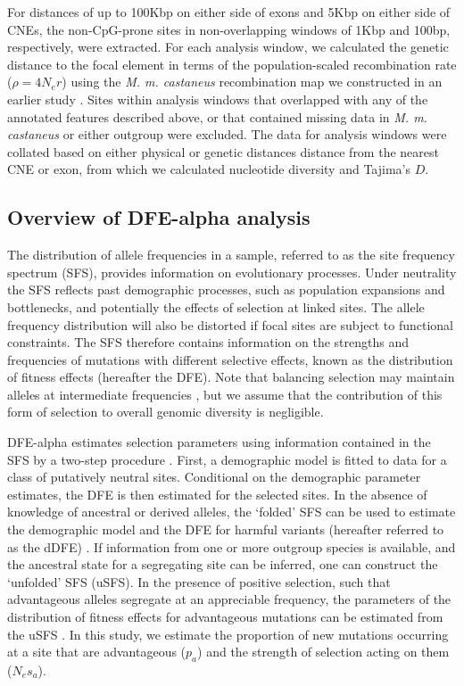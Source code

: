 	For distances of up to 100Kbp on either side of exons and 5Kbp on either side of CNEs, the non-CpG-prone sites in non-overlapping windows of 1Kbp and 100bp, respectively, were extracted. For each analysis window, we calculated the genetic distance to the focal element in terms of the population-scaled recombination rate ($\rho = 4N_er$) using the \textit{M. m. castaneus} recombination map we constructed in an earlier study \citep{RN340}. Sites within analysis windows that overlapped with any of the annotated features described above, or that contained missing data in \textit{M. m. castaneus} or either outgroup were excluded. The data for analysis windows were collated based on either physical or genetic distances distance from the nearest CNE or exon, from which we calculated nucleotide diversity and Tajima's $D$.

\subsection{Overview of DFE-alpha analysis}

	The distribution of allele frequencies in a sample, referred to as the site frequency spectrum (SFS), provides information on evolutionary processes. Under neutrality the SFS reflects past demographic processes, such as population expansions and bottlenecks, and potentially the effects of selection at linked sites. The allele frequency distribution will also be distorted if focal sites are subject to functional constraints. The SFS therefore contains information on the strengths and frequencies of mutations with different selective effects, known as the distribution of fitness effects (hereafter the DFE). Note that balancing selection may maintain alleles at intermediate frequencies \citep{RN103}, but we assume that the contribution of this form of selection to overall genomic diversity is negligible.

	DFE-alpha estimates selection parameters using information contained in the SFS by a two-step procedure \citep{RN164}. First, a demographic model is fitted to data for a class of putatively neutral sites. Conditional on the demographic parameter estimates, the DFE is then estimated for the selected sites. In the absence of knowledge of ancestral or derived alleles, the ‘folded’ SFS can be used to estimate the demographic model and the DFE for harmful variants (hereafter referred to as the dDFE) \citep{RN164}. If information from one or more outgroup species is available, and the ancestral state for a segregating site can be inferred, one can construct the ‘unfolded’ SFS (uSFS). In the presence of positive selection, such that advantageous alleles segregate at an appreciable frequency, the parameters of the distribution of fitness effects for advantageous mutations can be estimated from the uSFS \citep{RN210, RN321, RN354}. In this study, we estimate the proportion of new mutations occurring at a site that are advantageous ($p_a$) and the strength of selection acting on them ($N_es_a$).

